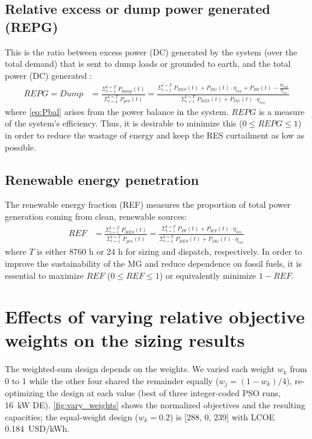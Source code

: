 \documentclass[final,3p,times]{elsarticle}
\begin{document}
\subsection{Relative excess or dump power generated (REPG)}

This is the ratio between excess power (DC) generated by the system (over the total demand) that is sent to dump loads or grounded to earth, and the total power (DC) generated \cite{kaabeche2011b}:
\begin{align}
    REPG = Dump & = \frac{\Sigma_{t=1}^{t=T} \; P_{dump}(t)}{\Sigma_{t=1}^{t=T} \; P_{gen}(t)} = \frac{\Sigma_{t=1}^{t=T} \; P_{RES}(t) + P_{DG}(t) \cdot \eta_{rec} + P_{BS}(t) - \frac{P_{load}}{\eta_{inv}}}{\Sigma_{t=1}^{t=T} \; P_{RES}(t) + P_{DG}(t) \cdot \eta_{rec}} \label{eq:Pbal}
\end{align}
where \cref{eq:Pbal} arises from the power balance in the system. $REPG$ is a measure of the system's efficiency. Thus, it is desirable to minimize this ($0 \leq REPG \leq 1$) in order to reduce the wastage of energy and keep the RES curtailment as low as possible. 

\subsection{Renewable energy penetration}
The renewable energy fraction (REF) measures the proportion of total power generation coming from clean, renewable sources:
\begin{align}
    REF & = \frac{\Sigma_{t=1}^{t=T} \; P_{RES}(t)}{\Sigma_{t=1}^{t=T} \; P_{gen}(t)} = \frac{\Sigma_{t=1}^{t=T} \; P_{PV}(t) + P_{WT}(t) \cdot \eta_{rec}}{\Sigma_{t=1}^{t=T} \; P_{RES}(t) + P_{DG}(t) \cdot \eta_{rec}}
\end{align}
where $T$ is either 8760 h or 24 h for sizing and dispatch, respectively. In order to improve the sustainability of the MG and reduce dependence on fossil fuels, it is essential to maximize $REF$ ($0 \leq REF \leq 1$) or equivalently minimize $1-REF$. 

\section{Effects of varying relative objective weights on the sizing results \label{app:weights}}

The weighted-sum design depends on the weights. We varied each weight $w_k$ from 0 to 1 while the other four shared the remainder equally ($w_j = (1-w_k)/4$), re-optimizing the design at each value (best of three integer-coded PSO runs, 16~kW DE). \cref{fig:vary_weights} shows the normalized objectives and the resulting capacities; the equal-weight design ($w_k = 0.2$) is [288, 0, 239] with LCOE 0.184~USD/kWh.
\end{document}
